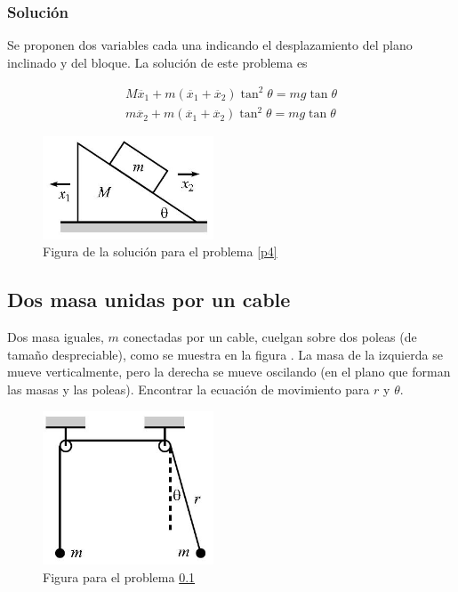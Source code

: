\documentclass[12pt]{book}
\theoremstyle{definition}
\theoremstyle{remark}
\theoremstyle{plain}
\begin{document}
\subsubsection{Solución}
Se proponen dos variables cada una indicando el desplazamiento del plano inclinado y del bloque.
La solución de este problema es

\begin{equation*}
\label{equ1}
\begin{aligned}
M \ddot{x_1} + m ( \ddot{x_1} + \ddot{x_2}) \tan ^2 \theta = m g \tan \theta \\
m \ddot{x_2}+m  ( \ddot{x_1} + \ddot{x_2}) \tan ^2 \theta = m g \tan \theta
\end{aligned}
\end{equation*}

\begin{figure}
\centering
\includegraphics[width=2in]{solucionplano.jpeg}
\caption{Figura de la solución  para el problema \ref{p4}}
\label{fig6}
\end{figure}

\subsection{Dos masa unidas por un cable}
\label{p3}
Dos masa iguales, $m$ conectadas por un cable, cuelgan sobre dos poleas (de tamaño despreciable), como se muestra en la figura .  La masa de la izquierda se mueve verticalmente, pero la derecha se mueve oscilando (en el plano que forman las masas y las poleas). Encontrar la ecuación de movimiento para $r$ y $\theta$.

\begin{figure}
\centering
\includegraphics[width=2in]{poleas.jpeg}
\caption{Figura para el problema \ref{p3}}
\label{fig3}
\end{figure}
\end{document}
